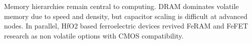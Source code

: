 Memory hierarchies remain central to computing. DRAM dominates volatile memory due to speed and density, but capacitor scaling is difficult at advanced nodes. In parallel, HfO2 based ferroelectric devices revived FeRAM and FeFET research as non volatile options with CMOS compatibility.
